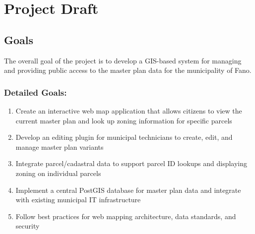 
\chapter{Project Draft}
\label{ch:project_draft}

\section{Goals}\label{sec:goals}
The overall goal of the project is to develop a GIS-based system for managing and providing public access to the master plan data for the municipality of Fano.

\subsection{Detailed Goals:}\label{subsec:detailed-goals:}
\begin{enumerate}
    \item Create an interactive web map application that allows citizens to view the current master plan and look up zoning information for specific parcels
    \item Develop an editing plugin for municipal technicians to create, edit, and manage master plan variants
    \item Integrate parcel/cadastral data to support parcel ID lookups and displaying zoning on individual parcels
    \item Implement a central PostGIS database for master plan data and integrate with existing municipal IT infrastructure
    \item Follow best practices for web mapping architecture, data standards, and security
\end{enumerate}

